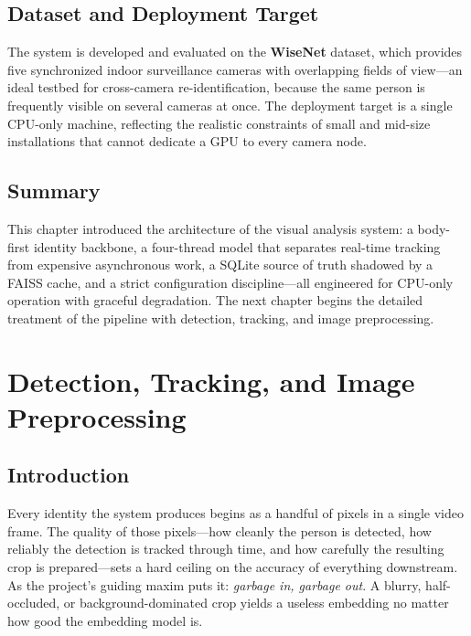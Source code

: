 \documentclass[12pt]{report}
\begin{document}
\section{Dataset and Deployment Target}
The system is developed and evaluated on the \textbf{WiseNet} dataset, which provides five synchronized indoor surveillance cameras with overlapping fields of view---an ideal testbed for cross-camera re-identification, because the same person is frequently visible on several cameras at once. The deployment target is a single CPU-only machine, reflecting the realistic constraints of small and mid-size installations that cannot dedicate a GPU to every camera node.

\section{Summary}
This chapter introduced the architecture of the visual analysis system: a body-first identity backbone, a four-thread model that separates real-time tracking from expensive asynchronous work, a SQLite source of truth shadowed by a FAISS cache, and a strict configuration discipline---all engineered for CPU-only operation with graceful degradation. The next chapter begins the detailed treatment of the pipeline with detection, tracking, and image preprocessing.

\newpage

\chapter{Detection, Tracking, and Image Preprocessing}
\setcounter{section}{0}

\section{Introduction}
Every identity the system produces begins as a handful of pixels in a single video frame. The quality of those pixels---how cleanly the person is detected, how reliably the detection is tracked through time, and how carefully the resulting crop is prepared---sets a hard ceiling on the accuracy of everything downstream. As the project's guiding maxim puts it: \emph{garbage in, garbage out}. A blurry, half-occluded, or background-dominated crop yields a useless embedding no matter how good the embedding model is.
\end{document}
